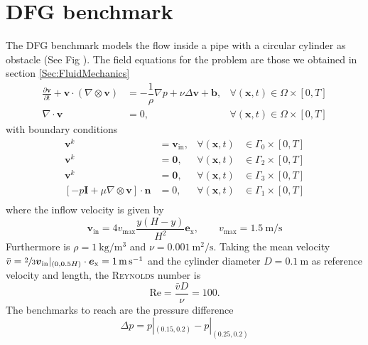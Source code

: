 \documentclass[]{scrartcl}
\newcommand{\pfrac}[2]{\frac{\partial #1}{\partial #2}}
\newcommand{\bs}[1]{\boldsymbol{#1}}
\begin{document}
\section{DFG benchmark}
The DFG benchmark models the flow inside a pipe with a circular cylinder as obstacle (See Fig ). The field equations for the problem are those we obtained in section \ref{Sec:FluidMechanics}
\begin{equation*}
\begin{aligned}
\pfrac{\bs{v}}{t} + \bs{v} \cdot (\nabla \otimes \bs{v})&=  - \dfrac{1}{\rho}\nabla p + \nu \Delta \bs{v} + \bs{b}, &\forall (\bs{x}, t) \in \Omega \times \left[0, T \right] \\
\nabla \cdot \bs{v}&= 0, &\forall (\bs{x}, t) \in \Omega \times  \left[0, T \right]
\end{aligned}
\end{equation*}
with boundary conditions
\begin{equation*}
\begin{aligned}
\bs{v}^{k} &= \bs{v}_\textrm{in},  &\forall(\bs{x}, t) &\in \Gamma_0 \times [0, T] \\
\bs{v}^{k} &= \bs{0}, &\forall(\bs{x}, t) &\in \Gamma_2 \times [0,T]\\
\bs{v}^{k} &= \bs{0}, &\forall(\bs{x}, t) &\in \Gamma_3 \times [0, T] \\
[-p\bs{I} + \mu \nabla \otimes \bs{v}] \cdot \bs{n} &=0, &\forall(\bs{x}, t) &\in \Gamma_1 \times [0, T] \\
\end{aligned}
\end{equation*}
where the inflow velocity is given by
\begin{equation*}
	\bs{v}_\textrm{in} = 4v_\textrm{max}\dfrac{y(H-y)}{H^2}\bs{e}_\textrm{x},
	\qquad
	v_\textrm{max} = \SI{1.5}{\meter\per\second}
\end{equation*}
Furthermore is $\rho = \SI{1}{\kilogram\per\meter^3}$ and $\nu = \SI{0.001}{\meter^2\per\second}$. Taking the mean velocity $\bar{v} = \sfrac{2}{3} \bs{v}_\textrm{in}|_{(0,0.5H)} \cdot \bs{e}_\textrm{x} =  \SI{1}{\meter\per\second} $ and the cylinder diameter $D= \SI{0.1}{\meter}$ as reference velocity and length, the \textsc{Reynolds} number is
\begin{equation*}
	\textrm{Re} = \dfrac{\bar{v}D}{\nu} = 100.
\end{equation*}
The benchmarks to reach are the pressure difference
\begin{equation*}
	\Delta p = p|_{(0.15,0.2)} - p|_{(0.25,0.2)}
\end{equation*}
\end{document}
